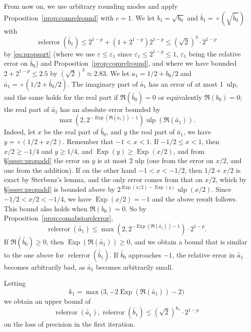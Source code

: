 \documentclass [11pt]{article}
\newcommand {\corr}[1]{{#1}}
\newcommand {\appro}[1]{\widetilde {#1}}
\newcommand {\ulp}[1]{#1~ulp}
\newcommand {\Ulp}{{\operatorname {ulp}}}
\DeclareMathOperator{\Exp}{\operatorname {Exp}}
\newcommand{\relerror}{\operatorname {relerror}}
\newcommand {\round}{\operatorname {\circ}}
\renewcommand {\epsilon}{\varepsilon}
\renewcommand {\leq}{\leqslant}
\renewcommand {\geq}{\geqslant}
\begin{document}
From now on, we use arbitrary rounding modes and apply
Proposition~\ref {prop:comrelround} with $c = 1$.
We let $\corr {b_1} = \sqrt {\corr {b_0}}$ and
$\appro {b_1} = \round \left( \sqrt {\appro {b_0}} \right)$ with
\[
\relerror (\appro {b_1}) \leq
2^{1-p} + \left( 1 + 2^{1-p} \right) 2^{1-p}
\leq (\sqrt 2)^3 \cdot 2^{1-p}
\]
by \eqref {eq:propsqrt} (where we use $\epsilon \leq \epsilon_1$
since $\epsilon_1 \leq 2^{1-p} \leq 1$, $\epsilon_1$ being the relative
error on $\appro{b_0}$)
and Proposition~\ref {prop:comrelround},
and where we have bounded $2 + 2^{1-p} \leq 2.5$
by $(\sqrt 2)^3 \approx 2.83$.
We let $\corr {a_1} = 1/2 + \corr {b_0}/2$ and
$\appro {a_1} = \round ( 1/2 + \appro{b_0}/2 )$.
The imaginary part of $\appro {a_1}$ has an error of at most \ulp{1},
and the same holds for the real part if $\Re (\appro {b_0}) = 0$
or equivalently $\Re (b_0) = 0$;
the real part of $\appro {a_1}$
has an absolute error bounded by
\[
\max \left( 2, 2^{- \Exp (\Re (\appro {a_1})) - 1} \right)
\Ulp \left( \Re (\appro {a_1}) \right).
\]
Indeed, let $x$ be the real part of $\appro{b_0}$, and $y$ the real part of $\appro{a_1}$,
we have $y = \round (1/2 + x/2)$.
Remember that $-1 < x < 1$. If $-1/2 \leq x < 1$, then $x/2 \geq -1/4$ and
$y \geq 1/4$, and $\Exp (y) \geq \Exp (x/2)$, and from
\S\ref{sssec:propadd} the error on $y$ is at most 2 ulp (one from the
error on $x/2$, and one from the addition).
If on the other hand $-1 < x < -1/2$, then $1/2 + x/2$ is exact by
Sterbenz's lemma, and the only error
comes from that on $x/2$, which by \S\ref{sssec:propadd} is bounded above by
$2^{\Exp(x/2)-\Exp(y)} \Ulp (x/2)$.
Since $-1/2 < x/2 < -1/4$, we have $\Exp(x/2)=-1$ and the above result follows.
This bound also holds when $\Re (b_0) = 0$.
So by Proposition~\ref {prop:comabstorelerror},
\[
\relerror (\appro {a_1})
\leq
\max \left( 2, 2^{- \Exp (\Re (\appro {a_1})) -1 } \right) \cdot 2^{1-p}.
\]
If $\Re (\appro {b_0}) \geq 0$, then $\Exp (\Re (\appro {a_1})) \geq 0$, and
we obtain a bound that is similar to the one above for
$\relerror (\appro {b_1})$. If $\appro {b_0}$ approaches $-1$,
the relative error in $\appro {a_1}$ becomes arbitrarily bad, as
$\appro {a_1}$ becomes arbitrarily small.

\noindent
Letting
\begin {equation}
\label {eq:agmk1}
k_1 = \max \big( 3, - 2 \Exp (\Re (\appro {a_1})) - 2 \big)
\end {equation}
we obtain an upper bound of
\begin {equation}
\label {eq:agmerr1}
\relerror (\appro {a_1}), \relerror (\appro {b_1})
\leq
\left( \sqrt 2 \right)^{k_1} \cdot 2^{1-p}
\end {equation}
on the loss of precision in the first iteration.
\end{document}
